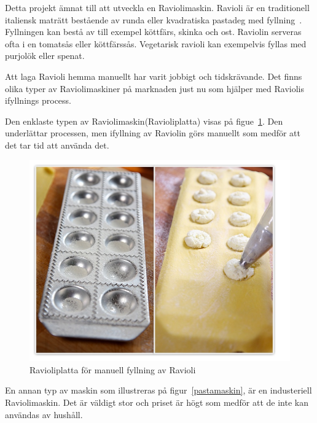 Detta projekt ämnat till att utveckla en Raviolimaskin. Ravioli är en traditionell italiensk maträtt bestående av runda eller kvadratiska pastadeg med fyllning~\cite{engproc}. Fyllningen kan bestå av till exempel köttfärs, skinka och ost. Raviolin serveras ofta i en tomatsås eller köttfärssås. Vegetarisk ravioli kan exempelvis fyllas med purjolök eller spenat.

Att laga Ravioli hemma manuellt har varit jobbigt och tidskrävande. Det finns olika typer av Raviolimaskiner på marknaden just nu som hjälper med Raviolis ifyllnings process. 

Den enklaste typen av Raviolimaskin(Ravioliplatta) visas på figue~\ref{ravioliplatta}. Den underlättar processen, men ifyllning av Raviolin görs manuellt som medför att det tar tid att använda det.

 
	\begin{figure}[h]
		\begin{center}
			\includegraphics[scale=0.5]{images/raviolimoldwithfilling.jpg}
			\caption{Ravioliplatta för manuell fyllning av Ravioli~\cite{ravioliplatta}}
			\label{ravioliplatta}	
		\end{center}
	\end{figure}
En annan typ av maskin som illustreras på figur~\ref{pastamaskin}, är en industeriell Raviolimaskin. Det är väldigt stor och priset är högt som medför att de inte kan användas av hushåll.

